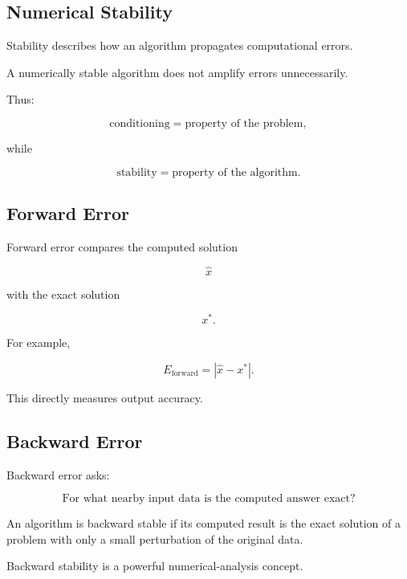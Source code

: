 \subsection{Numerical Stability}
\label{subsec:numerical-stability}

Stability describes how an algorithm propagates computational errors.

A numerically stable algorithm does not amplify errors unnecessarily.

Thus:

\[
\boxed{
\text{conditioning}
=
\text{property of the problem},
}
\]

while

\[
\boxed{
\text{stability}
=
\text{property of the algorithm}.
}
\]

\subsection{Forward Error}
\label{subsec:forward-error}

Forward error compares the computed solution

\[
\widehat{x}
\]

with the exact solution

\[
x^*.
\]

For example,

\[
\boxed{
E_{\mathrm{forward}}
=
|\widehat{x}-x^*|.
}
\]

This directly measures output accuracy.

\subsection{Backward Error}
\label{subsec:backward-error}

Backward error asks:

\[
\boxed{
\text{For what nearby input data is the computed answer exact?}
}
\]

An algorithm is backward stable if its computed result is the exact
solution of a problem with only a small perturbation of the original data.

Backward stability is a powerful numerical-analysis concept.

